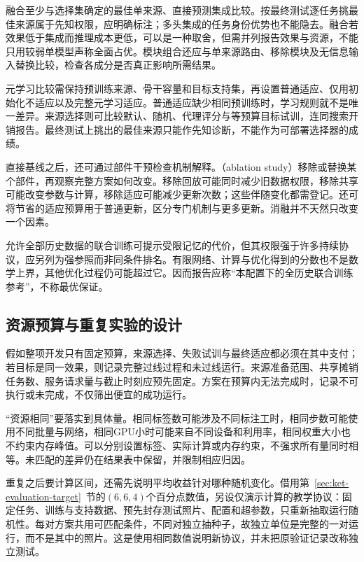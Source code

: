 融合至少与选择集确定的最佳单来源、直接预测集成比较。按最终测试逐任务挑最佳来源属于先知权限，应明确标注；多头集成的任务身份优势也不能隐去。融合若效果低于集成而推理成本更低，可以是一种取舍，但需并列报告效果与资源，不能只用较弱单模型声称全面占优。模块组合还应与单来源路由、移除模块及无信息输入替换比较，检查各成分是否真正影响所需结果。

元学习比较需保持预训练来源、骨干容量和目标支持集，再设置普通适应、仅用初始化不适应以及完整元学习适应。普通适应缺少相同预训练时，学习规则就不是唯一差异。来源选择则可比较默认、随机、代理评分与等预算目标试训，连同搜索开销报告。最终测试上挑出的最佳来源只能作先知诊断，不能作为可部署选择器的成绩。

直接基线之后，还可通过部件干预检查机制解释。（ablation study）移除或替换某个部件，再观察完整方案如何改变。移除回放可能同时减少旧数据权限，移除共享可能改变参数与计算，移除适应可能减少更新次数；这些伴随变化都需登记。还可将节省的适应预算用于普通更新，区分专门机制与更多更新。消融并不天然只改变一个因素。

允许全部历史数据的联合训练可提示受限记忆的代价，但其权限强于许多持续协议，应另列为强参照而非同条件排名。有限网络、计算与优化得到的分数也不是数学上界，其他优化过程仍可能超过它。因而报告应称“本配置下的全历史联合训练参考”，不称最优保证。

\subsection{资源预算与重复实验的设计}
\label{sec:ket-evaluation-repeats}

假如整项开发只有固定预算，来源选择、失败试训与最终适应都必须在其中支付；若目标是同一效果，则记录完整过线过程和未过线运行。来源准备范围、共享摊销任务数、服务请求量与截止时刻应预先固定。方案在预算内无法完成时，记录不可执行或未完成，不仅筛出便宜的成功运行。

“资源相同”要落实到具体量。相同标签数可能涉及不同标注工时，相同步数可能使用不同批量与网络，相同GPU小时可能来自不同设备和利用率，相同权重大小也不约束内存峰值。可以分别设置标签、实际计算或内存约束，不强求所有量同时相等。未匹配的差异仍在结果表中保留，并限制相应归因。

重复之后要计算区间，还需先说明平均收益针对哪种随机变化。借用第~\ref{sec:ket-evaluation-target}~节的$(6,6,4)$个百分点数值，另设仅演示计算的教学协议：固定任务、训练与支持数据、预先封存测试照片、配置和超参数，只重新抽取运行随机性。每对方案共用可匹配条件，不同对独立抽种子，故独立单位是完整的一对运行，而不是其中的照片。这是使用相同数值说明新协议，并未把原验证记录改称独立测试。

